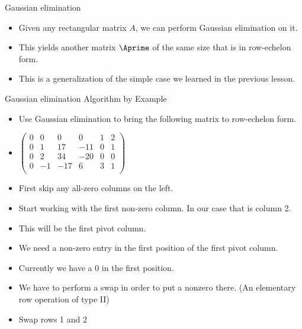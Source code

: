 \documentclass{beamer}
\begin{document}

\begin{frame}{Gaussian elimination}

\begin{itemize}
\item Given any rectangular matrix $A$, we can perform Gaussian elimination on it.
\item This yields another matrix $\Aprime$ of the same size that is in row-echelon form.
\item This is a generalization of the simple case we learned in the previous lesson.
\end{itemize}

\end{frame}



\begin{frame}{Gaussian elimination Algorithm by Example}

\begin{itemize}
\item Use Gaussian elimination to bring the following matrix to row-echelon
form.
\item $
\begin{pmatrix}
0 & 0  &   0  &  0   &  1  &  2 \\
0 & 1  &  17  & -11  &  0  &  1  \\
0 & 2  &  34  & -20  &  0  &  0 \\
0 & -1 &  -17   &  6 &  3  &  1 \\
\end{pmatrix}
$
\item First skip any all-zero columns on the left.
\item Start working with the first non-zero column. In our case that is column 2.
\item This will be the first pivot column.
\item We need a non-zero entry in the first position of the first pivot column.
\item Currently we have a 0 in the first position.
\item We have to perform a swap in order to put a nonzero there. (An elementary row operation of type II)
\item Swap rows 1 and 2
\end{itemize}
\end{frame}
\end{document}

